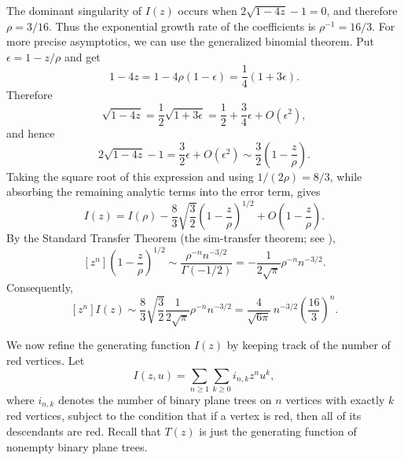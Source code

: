 \documentclass[11pt, onesided]{amsart}
\theoremstyle{remark}
\begin{document}
The dominant singularity of $I(z)$ occurs when $2\sqrt{1-4z}-1=0$, and therefore $\rho=3/16$. Thus the exponential growth rate of the coefficients is $\rho^{-1}=16/3$.
For more precise asymptotics, we can use the generalized binomial theorem.  Put $\epsilon=1-z/\rho$ and get
\[
1-4z
=1-4\rho(1-\epsilon)
=\frac14(1+3\epsilon).
\]
Therefore
\[
\sqrt{1-4z}
=\frac12\sqrt{1+3\epsilon}
=\frac12+\frac34\epsilon+O(\epsilon^2),
\]
and hence
\begin{equation} \label{firstrate}
2\sqrt{1-4z}-1
=\frac32\epsilon+O(\epsilon^2)
\sim \frac{3}{2}\left(1-\frac{z}{\rho}\right).
\end{equation}
Taking the square root of this expression and using $1/(2\rho)=8/3$, while absorbing the remaining analytic terms into the error term, gives
\[
I(z) = I(\rho) -\frac{8}{3}\sqrt{\frac32}
\left(1-\frac{z}{\rho}\right)^{1/2}
+O\left(1-\frac{z}{\rho}\right).
\]
By the Standard Transfer Theorem (the sim-transfer theorem; see
\cite[Corollary VI.1]{FlajoletSedgewick}),
\[
[z^n]\left(1-\frac{z}{\rho}\right)^{1/2}
\sim
\frac{\rho^{-n}n^{-3/2}}{\Gamma(-1/2)}
=-\frac{1}{2\sqrt{\pi}}\rho^{-n}n^{-3/2}.
\]
Consequently,
\begin{equation}
\label{eq:asympBinary}
[z^n]I(z)
\sim
\frac{8}{3}\sqrt{\frac32}\frac{1}{2\sqrt{\pi}}
\rho^{-n}n^{-3/2}
=
\frac{4}{\sqrt{6\pi}}\,n^{-3/2}
\left(\frac{16}{3}\right)^n.
\end{equation}

We now refine the generating function $I(z)$ by keeping track of the number of red vertices. Let \[ I(z,u)=\sum_{n\geq 1}\sum_{k\geq 0} i_{n,k} z^n u^k, \] where $i_{n,k}$ denotes the number of binary plane trees on $n$ vertices with exactly $k$ red vertices, subject to the condition that if a vertex is red, then all of its descendants are red. Recall that $T(z)$ is just the generating function of nonempty binary plane trees. 
\end{document}
